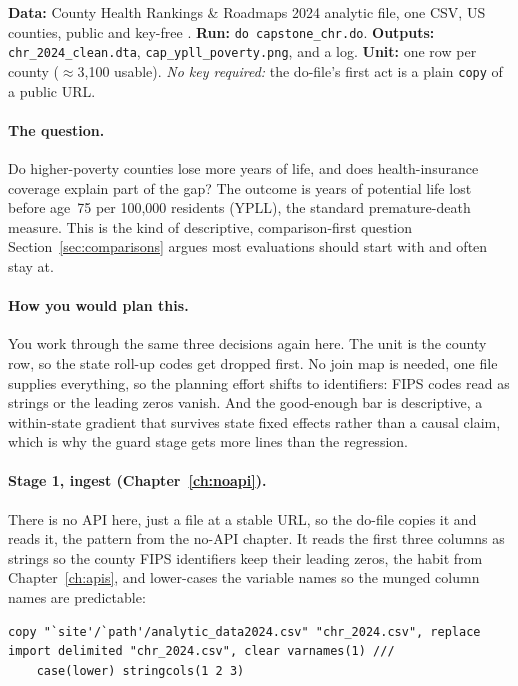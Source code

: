 \begin{kaobox}[frametitle={Get the files: \texttt{capstone\_chr.do}}]
\textbf{Data:} County Health Rankings \& Roadmaps 2024 analytic file, one CSV, US counties, public and key-free \parencite{chr2024}. \textbf{Run:} \texttt{do capstone\_chr.do}. \textbf{Outputs:} \texttt{chr\_2024\_clean.dta}, \texttt{cap\_ypll\_poverty.png}, and a log. \textbf{Unit:} one row per county ($\approx$3,100 usable). \emph{No key required:} the do-file's first act is a plain \texttt{copy} of a public URL.
\end{kaobox}

\paragraph{The question.} Do higher-poverty counties lose more years of life, and does health-insurance coverage explain part of the gap? The outcome is years of potential life lost before age~75 per 100,000 residents (YPLL), the standard premature-death measure. This is the kind of descriptive, comparison-first question Section~\ref{sec:comparisons} argues most evaluations should start with and often stay at.

\paragraph{How you would plan this.} You work through the same three decisions again here. The unit is the county row, so the state roll-up codes get dropped first. No join map is needed, one file supplies everything, so the planning effort shifts to identifiers: FIPS codes read as strings or the leading zeros vanish. And the good-enough bar is descriptive, a within-state gradient that survives state fixed effects rather than a causal claim, which is why the guard stage gets more lines than the regression.

\paragraph{Stage 1, ingest (Chapter~\ref{ch:noapi}).} There is no API here, just a file at a stable URL, so the do-file copies it and reads it, the pattern from the no-API chapter. It reads the first three columns as strings so the county FIPS identifiers keep their leading zeros, the habit from Chapter~\ref{ch:apis}, and lower-cases the variable names so the munged column names are predictable:
\par
{\footnotesize
\begin{verbatim}
copy "`site'/`path'/analytic_data2024.csv" "chr_2024.csv", replace
import delimited "chr_2024.csv", clear varnames(1) ///
    case(lower) stringcols(1 2 3)
\end{verbatim}
}

